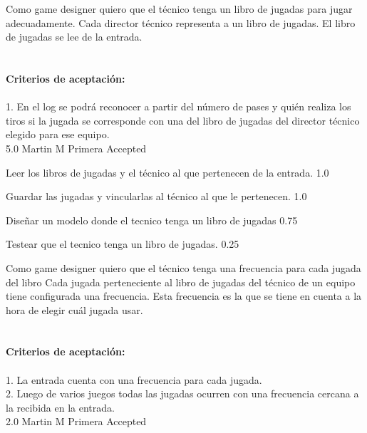 	{Como game designer quiero que el t\'ecnico tenga un libro de jugadas para jugar adecuadamente.} %
	{Cada director técnico representa a un libro de jugadas. El libro de jugadas se lee de la entrada. \\
  \\
  \\
\textbf{Criterios de aceptación:}\\
  \\
1. En el log se podrá reconocer a partir del número de pases y quién realiza los tiros si la jugada se corresponde con una del libro de jugadas del director técnico elegido para ese equipo.
 \\
} %
	{} %
	{5.0} %
	{Martin M} %
	{Primera} %
	{Accepted} %

		{Leer los libros de jugadas y el técnico al que pertenecen de la entrada.} %
		{} %
		{1.0} %
		{} %
		{} %
		{} %

		{Guardar las jugadas y vincularlas al técnico al que le pertenecen.} %
		{} %
		{1.0} %
		{} %
		{} %
		{} %

		{Diseñar un modelo donde el tecnico tenga un libro de jugadas} %
		{} %
		{0.75} %
		{} %
		{} %
		{} %


		{Testear que el tecnico tenga un libro de jugadas.} %
		{} %
		{0.25} %
		{} %
		{} %
		{} %

\vspace{20pt}


	{Como game designer quiero que el t\'ecnico tenga una frecuencia para cada jugada del libro} %
	{Cada jugada perteneciente al libro de jugadas del técnico de un equipo tiene configurada una frecuencia. Esta frecuencia es la que se tiene en cuenta a la hora de elegir cuál jugada usar. \\
  \\
  \\
\textbf{Criterios de aceptación:}\\
  \\
1. La entrada cuenta con una frecuencia para cada jugada. \\
2. Luego de varios juegos todas las jugadas ocurren con una frecuencia cercana a la recibida en la entrada. \\
} %
	{} %
	{2.0} %
	{Martin M} %
	{Primera} %
	{Accepted} %


